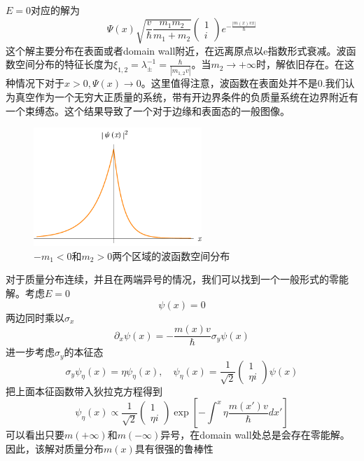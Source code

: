 \documentclass{article}
\numberwithin{equation}{subsection}
\begin{document}
$E=0$对应的解为
\begin{equation}
    \Psi(x)\sqrt{\frac{v}{\hbar}\frac{m_1m_2}{m_1+m_2}}\begin{pmatrix}
        1\\i
    \end{pmatrix}e^{-\frac{|m(x)vx|}{\hbar}}
\end{equation}
这个解主要分布在表面或者domain wall附近，在远离原点以e指数形式衰减。波函数空间分布的特征长度为$\xi_{1,2}=\lambda_{\pm}^{-1}=\frac{\hbar}{|m_{1,2}v|}$。当$m_2\to+\infty$时，解依旧存在。在这种情况下对于$x>0,\Psi(x)\to0$。这里值得注意，波函数在表面处并不是0.我们认为真空作为一个无穷大正质量的系统，带有开边界条件的负质量系统在边界附近有一个束缚态。这个结果导致了一个对于边缘和表面态的一般图像。\\
\begin{figure}[h]
    \centering
    \includegraphics[width=2.5in]{dirac3.pdf}
    \caption{$-m_1<0$和$m_2>0$两个区域的波函数空间分布}\label{dirac pic 3}
  \end{figure}
对于质量分布连续，并且在两端异号的情况，我们可以找到一个一般形式的零能解。考虑$E=0$
\begin{equation}
    [-i\hbar\partial_x\sigma_x+m(x)v^2\sigma_z]\psi(x)=0
\end{equation}
两边同时乘以$\sigma_x$
\begin{equation}
    \partial_x\psi(x)=-\frac{m(x)v}{\hbar}\sigma_y\psi(x)
\end{equation}
进一步考虑$\sigma_y$的本征态
\begin{equation}
    \sigma_y\psi_\eta(x)=\eta\psi_\eta(x),\quad\psi_\eta(x)=\frac{1}{\sqrt{2}}\begin{pmatrix}1\\\eta i\end{pmatrix}\psi(x)
\end{equation}
把上面本征函数带入狄拉克方程得到
\begin{equation}
    \psi_\eta(x)\propto\frac{1}{\sqrt{2}}\begin{pmatrix}1\\\eta i\end{pmatrix}\exp\left[-\int^x\eta\frac{m(x')v}{\hbar}dx'\right]
\end{equation}
可以看出只要$m(+\infty)$和$m(-\infty)$异号，在domain wall处总是会存在零能解。因此，该解对质量分布$m(x)$具有很强的鲁棒性
\end{document}

